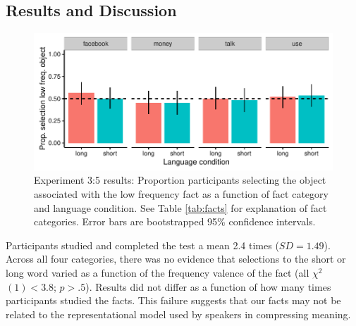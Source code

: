 \subsection{Results and Discussion}
  \begin{figure}[t!]
 \begin{center}
  \includegraphics[width=6in]{figs/fact_plots.pdf}
  \caption{\label{fig:fact_plots} Experiment 3:5 results: Proportion participants selecting the object associated with the low frequency fact as a function of fact category and language condition. See Table \ref{tab:facts} for explanation of fact categories. Error bars are bootstrapped 95\% confidence intervals.}
 \end{center}
\end{figure}
Participants studied and completed the test a mean 2.4 times ($SD = 1.49$).  Across all four categories, there was no evidence that selections to the short or long word varied as a function of the frequency valence of the fact (all ${\chi}^2$$(1) < 3.8$; $p > .5$). Results did not differ as a function of how many times participants studied the facts.  This failure suggests that our facts may not be related to the representational model used by speakers in compressing meaning. 



